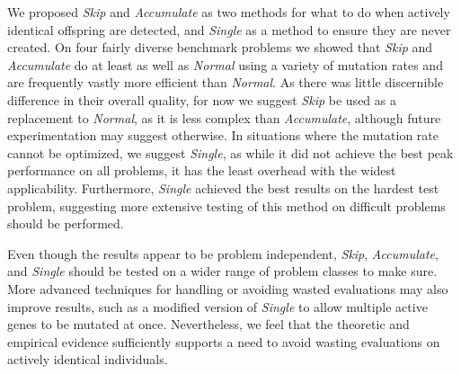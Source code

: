 \documentclass[runningheads,a4paper]{llncs}
\begin{document}
We proposed \emph{Skip} and \emph{Accumulate} as two methods for what to do when
actively identical offspring are detected, and \emph{Single} as a method to ensure
they are never created.  On four fairly diverse benchmark problems we showed that
\emph{Skip} and \emph{Accumulate} do at least as well as \emph{Normal} using a
variety of mutation rates and are frequently vastly more efficient than \emph{Normal}.
As there was little discernible difference in their overall quality, for now we suggest \emph{Skip}
be used as a replacement to \emph{Normal}, as it is less complex than \emph{Accumulate},
although future experimentation may suggest otherwise.  In situations where the mutation
rate cannot be optimized, we suggest \emph{Single}, as while it did not achieve
the best peak performance on all problems, it has the least overhead with the widest applicability.
Furthermore, \emph{Single} achieved the best results on the hardest test problem, suggesting more
extensive testing of this method on difficult problems should be performed.

Even though the results appear to be problem independent, \emph{Skip}, \emph{Accumulate},
and \emph{Single} should be tested on a wider range of problem classes to make sure.
More advanced techniques for handling or avoiding wasted evaluations may also improve
results, such as a modified version of \emph{Single} to allow multiple active genes
to be mutated at once.  Nevertheless, we feel that the theoretic and empirical evidence
sufficiently supports a need to avoid wasting evaluations on actively identical
individuals.



\end{document}
